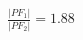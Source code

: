 \documentclass[preview]{standalone}
\begin{document}
\begin{align*}
\frac{|PF_1|}{|PF_2|} = 1.88
\end{align*}
\end{document}
